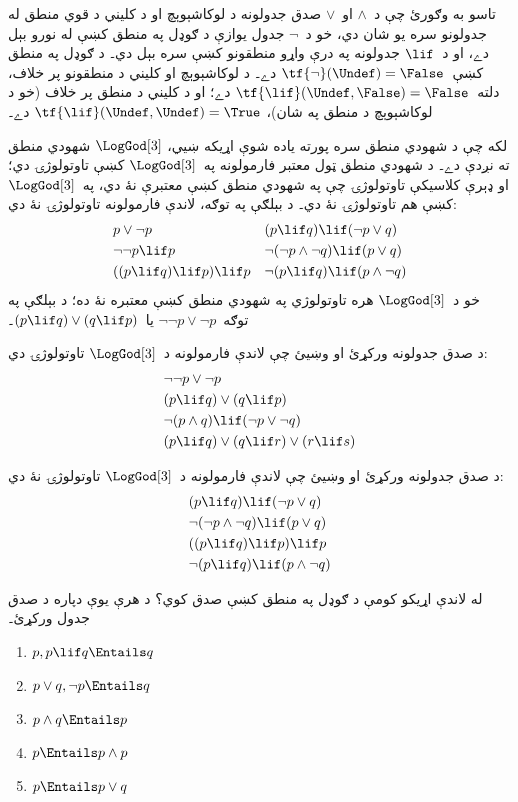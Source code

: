 \documentclass[../../../include/open-logic-section]{subfiles}
\begin{document}
تاسو به وګورئ چې د~$\land$ او~$\lor$ صدق جدولونه د
لوکاشېوېچ او د کليني د قوي منطق له جدولونو سره يو شان دي، خو
د~$\lnot$ جدول يوازې د ګوډل په منطق کښې له نورو بېل دے، او
د~$\lif$ جدولونه په درې واړو منطقونو کښې سره بېل دي۔
د ګوډل په منطق کښې~$\tf{\lnot}(\Undef) = \False$ دے۔ د لوکاشېوېچ
او کليني د منطقونو پر خلاف، دلته~$\tf{\lif}(\Undef, \False) = \False$
دے؛ او د کليني د منطق پر خلاف (خو د لوکاشېوېچ د منطق په شان)،
$\tf{\lif}(\Undef,
\Undef) = \True$ دے۔

لکه چې د شهودي منطق سره پورته ياده شوې اړيکه ښيي،
$\LogGod[3]$ شهودي منطق ته نږدې دے۔ د شهودي منطق ټول معتبر
فارمولونه په~$\LogGod[3]$ کښې تاوتولوژۍ دي؛ او ډېرې کلاسيکې
تاوتولوژۍ چې په شهودي منطق کښې معتبرې نۀ دي، په~$\LogGod[3]$
کښې هم تاوتولوژۍ نۀ دي۔ د بېلګې په توګه، لاندې فارمولونه
تاوتولوژۍ نۀ دي:
\begin{align*}
  & p \lor \lnot p && (p \lif q) \lif (\lnot p \lor q) \\
  & \lnot\lnot p \lif p && \lnot(\lnot p \land \lnot q) \lif (p \lor q) \\
  & ((p \lif q) \lif p) \lif p && \lnot(p \lif q) \lif (p \land \lnot q)
\end{align*}
خو د~$\LogGod[3]$ هره تاوتولوژي په شهودي منطق کښې معتبره
نۀ ده؛ د بېلګې په توګه~$\lnot\lnot p \lor \lnot p$ يا~$(p
\lif q) \lor (q \lif p)$۔

\begin{prob}
  د صدق جدولونه ورکړئ او وښيئ چې لاندې فارمولونه د~$\LogGod[3]$
  تاوتولوژۍ دي:
  \begin{align*}
    & \lnot\lnot p \lor \lnot p\\
    & (p \lif q) \lor (q \lif p) \\
    & \lnot(p \land q) \lif (\lnot p \lor \lnot q) \\
    & (p \lif q) \lor (q \lif r) \lor (r \lif s)
  \end{align*}
\end{prob}

\begin{prob}
  د صدق جدولونه ورکړئ او وښيئ چې لاندې فارمولونه د~$\LogGod[3]$
  تاوتولوژۍ نۀ دي:
  \begin{align*}
    & (p \lif q) \lif (\lnot p \lor q) \\
    & \lnot(\lnot p \land \lnot q) \lif (p \lor q) \\
    & ((p \lif q) \lif p) \lif p \\
    & \lnot(p \lif q) \lif (p \land \lnot q)
  \end{align*}
\end{prob}

\begin{prob}
  له لاندې اړيکو کومې د ګوډل په منطق کښې صدق کوي؟ د هرې يوې
  دپاره د صدق جدول ورکړئ۔
  \begin{enumerate}
    \item $p, p \lif q \Entails q$
    \item $p \lor q, \lnot p \Entails q$
    \item $p \land q \Entails p$
    \item $p \Entails p \land p$
    \item $p \Entails p \lor q$
  \end{enumerate}
\end{prob}
\end{document}
